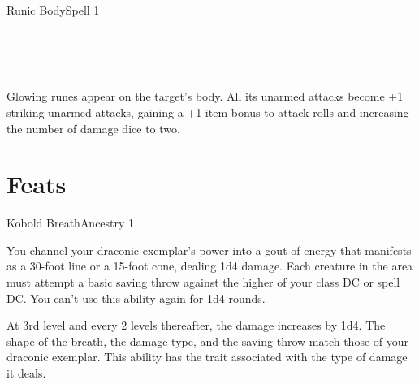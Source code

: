 \documentclass[12pt,openany,twocolumn]{book}
\begin{document}
\begin{spell}{Runic Body}{}{Spell 1}
    \begin{spellinfo}
         \\
         \\
         \\
    \end{spellinfo}

    \begin{spellbody}
        Glowing runes appear on the target's body. All its unarmed attacks become +1 striking unarmed attacks, gaining a +1 item bonus to attack rolls and increasing the number of damage dice to two.
    \end{spellbody}



\end{spell}


\chapter*{Feats}

\begin{feat}{Kobold Breath}{Ancestry 1}
    \begin{featinfo}
    \end{featinfo}

    \begin{featbody}
        You channel your draconic exemplar's power into a gout of energy that manifests as a 30-foot line or a 15-foot cone, dealing 1d4 damage. Each creature in the area must attempt a basic saving throw against the higher of your class DC or spell DC. You can't use this ability again for 1d4 rounds.

        At 3rd level and every 2 levels thereafter, the damage increases by 1d4. The shape of the breath, the damage type, and the saving throw match those of your draconic exemplar. This ability has the trait associated with the type of damage it deals.
    \end{featbody}

\end{feat}
\end{document}
